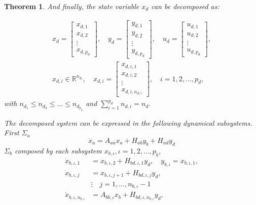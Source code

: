\documentclass[11pt,letterpaper,twoside,openright]{report}
\newtheorem{theorem}{Theorem}[chapter]
\begin{document}
\begin{theorem}
And finally, the state variable $x_d$ can be decomposed as:

\begin{eqnarray}
	x_d=
	\begin{bmatrix}
		x_{d,1} \\
		x_{d,2} \\
		\vdots \\
		x_{d,p_d}
	\end{bmatrix}, \quad
	y_d=
	\begin{bmatrix}
		y_{d,1} \\
		y_{d,2} \\
		\vdots \\
		y_{d,p_d}
	\end{bmatrix}, \quad
	u_d=
	\begin{bmatrix}
		u_{d,1} \\
		u_{d,2} \\
		\vdots \\
		u_{d,p_d}
	\end{bmatrix}, \\
	x_{d,i} \in \mathbb{R}^{n_{d_{i}}},\quad
	x_{d,i}=
	\begin{bmatrix}
		x_{d,i,1} \\
		x_{d,i,2} \\
		\vdots \\
		x_{d,i,n_{d,i}}
	\end{bmatrix}, \quad i=1,2,...,p_d,
\end{eqnarray}
with $n_{d_1} \leq n_{d_2} \leq \hdots \leq n_{d_{p_d}}$ and $\sum_{i=1}^{p_d} n_{d,i}=n_d$.

The decomposed system can be expressed in the following dynamical subsystems. First $\Sigma_a$
\begin{equation}\label{ecu: xa}
	\dot{x}_a=A_{aa}x_a + H_{ab}y_b + H_{ad}y_d
\end{equation}
$\Sigma_b$ composed by each subsystem $x_{b,\iota},\iota=1,2,...,p_b$,
\begin{equation}
	\begin{split}\label{ecu: xb}
		\dot{x}_{b,\iota,1} &= x_{b,\iota,2} + H_{bd,\iota,1}y_d, \quad y_{b,\iota}=x_{b,\iota,1}, \\
		\dot{x}_{b,\iota,j} &= x_{b,\iota,j+1} + H_{bd,\iota,j}y_d, \\
		& \vdots \quad j=1,...,n_{b,\iota}-1\\
		\dot{x}_{b,\iota,n_{b,\iota}} &= A_{bb,\iota}x_{b} + H_{bd,\iota,n_{b,\iota}}y_d, 
	\end{split}
\end{equation}


\end{theorem}
\end{document}
